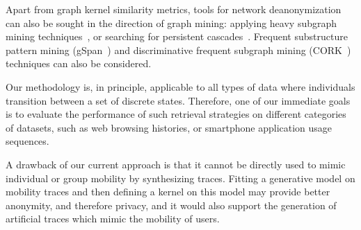 Apart from graph kernel similarity metrics, tools for network deanonymization can also be sought in the direction of graph mining: applying heavy subgraph mining techniques~\cite{Bogdanov2011}, or searching for persistent cascades~\cite{Morse16}.
Frequent substructure pattern mining (gSpan~\cite{Yan2002}) and discriminative frequent subgraph mining (CORK~\cite{Thoma2010}) techniques can also be considered.

Our methodology is, in principle, applicable to all types of data where individuals transition between a set of discrete states.
Therefore, one of our immediate goals is to evaluate the performance of such retrieval strategies on different categories of datasets, such as web browsing histories, or smartphone application usage sequences.

A drawback of our current approach is that it cannot be directly used to mimic individual or group mobility by synthesizing traces.
Fitting a generative model on mobility traces and then defining a kernel on this model may provide better anonymity, and therefore privacy, and it would also support the generation of artificial traces which mimic the mobility of users.

